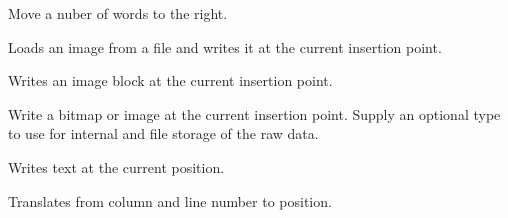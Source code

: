 
Move a nuber of words to the right.

\label{wxrichtextctrlwriteimage}


Loads an image from a file and writes it at the current insertion point.


Writes an image block at the current insertion point.



Write a bitmap or image at the current insertion point. Supply an optional type to use
for internal and file storage of the raw data.

\label{wxrichtextctrlwritetext}


Writes text at the current position.

\label{wxrichtextctrlxytoposition}


Translates from column and line number to position.

